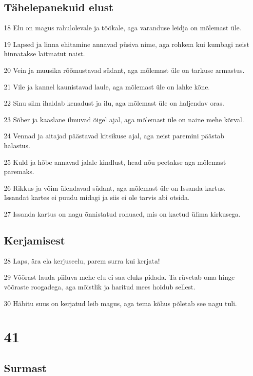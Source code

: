 \section*{Tähelepanekuid elust}

\par 18 Elu on magus rahulolevale ja töökale, aga varanduse leidja on mõlemast üle.
\par 19 Lapsed ja linna ehitamine annavad püsiva nime, aga rohkem kui kumbagi neist hinnatakse laitmatut naist.
\par 20 Vein ja muusika rõõmustavad südant, aga mõlemast üle on tarkuse armastus.
\par 21 Vile ja kannel kaunistavad laule, aga mõlemast üle on lahke kõne.
\par 22 Sinu silm ihaldab kenadust ja ilu, aga mõlemast üle on haljendav oras.
\par 23 Sõber ja kaaslane ilmuvad õigel ajal, aga mõlemast üle on naine mehe kõrval.
\par 24 Vennad ja aitajad päästavad kitsikuse ajal, aga neist paremini päästab halastus.
\par 25 Kuld ja hõbe annavad jalale kindlust, head nõu peetakse aga mõlemast paremaks.
\par 26 Rikkus ja võim ülendavad südant, aga mõlemast üle on Issanda kartus. Issandat kartes ei puudu midagi ja siis ei ole tarvis abi otsida.
\par 27 Issanda kartus on nagu õnnistatud rohuaed, mis on kaetud ülima kirkusega.

\section*{Kerjamisest}

\par 28 Laps, ära ela kerjuseelu, parem surra kui kerjata!
\par 29 Võõrast lauda piiluva mehe elu ei saa eluks pidada. Ta rüvetab oma hinge võõraste roogadega, aga mõistlik ja haritud mees hoidub sellest.
\par 30 Häbitu suus on kerjatud leib magus, aga tema kõhus põletab see nagu tuli.

\chapter{41}

\section*{Surmast}

